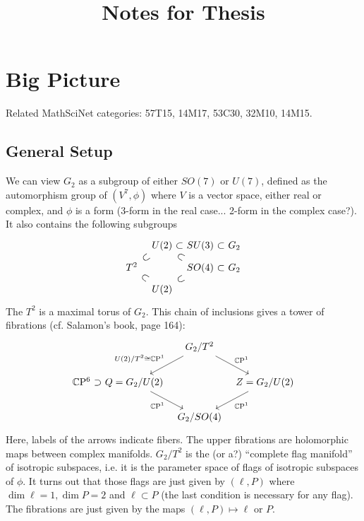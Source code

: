 \documentclass{scrartcl}
\title{Notes for Thesis}
\author{}
\date{}
\begin{document}
\maketitle
\tableofcontents

\section{Big Picture}

Related MathSciNet categories: 57T15, 14M17, 53C30, 32M10, 14M15.

\subsection{General Setup}

We can view $G_2$ as a subgroup of either $SO(7)$ or $U(7)$, defined as the automorphism group of $(V^7,\phi)$ where $V$ is a vector space, either real or complex, and $\phi$ is a form (3-form in the real case... 2-form in the complex case?).
It also contains the following subgroups
\begin{equation*}
	\begin{tikzcd}[sep=tiny]
		& U(2) \ar[draw=none]{r}[sloped,auto=false]{\scalebox{1.3}[1.3]{$\subset$}}
		\ar[draw=none]{dr}[sloped,auto=false]{\scalebox{1.3}[1.3]{$\subset$}} 
		& SU(3) \ar[draw=none]{r}[sloped,auto=false]{\scalebox{1.3}[1.3]{$\subset$}} 
		& G_2 \\
		T^2 \ar[draw=none]{ur}[sloped,auto=false]{\scalebox{1.3}[1.3]{$\subset$}}
		\ar[draw=none]{dr}[sloped,auto=false]{\scalebox{1.3}[1.3]{$\subset$}} & 
		& SO(4) \ar[draw=none]{r}[sloped,auto=false]{\scalebox{1.3}[1.3]{$\subset$}}
		& G_2\\
		& U(2) \ar[draw=none]{ur}[sloped,auto=false]{\scalebox{1.3}[1.3]{$\subset$}}
	\end{tikzcd}
\end{equation*}
The $T^2$ is a
maximal torus of $G_2$. This chain of inclusions gives a tower of fibrations (cf. Salamon's book, page 164):
\begin{equation*}
	\begin{tikzcd}[column sep=tiny]
		& & G_2/T^2 \ar[dr,"\CP^1"] \ar[dl,"U(2)/T^2\cong \CP^1"'] \\
		\CP^6 \ar[draw=none]{r}[sloped,auto=false]{\scalebox{1.3}[1.3]{$\supset$}}
		&[-23pt] Q=G_2/U(2) \ar[dr,"\CP^1"'] & & Z=G_2/U(2) \ar[dl,"\CP^1"]\\
		& & G_2/SO(4)
	\end{tikzcd}
\end{equation*}
Here, labels of the arrows indicate fibers. The upper fibrations are holomorphic maps between complex manifolds. 
$G_2/T^2$ is the (or a?) ``complete flag manifold'' of isotropic subspaces, i.e. it is the parameter space of flags of isotropic subspaces of $\phi$. It turns out
that those flags are just given by $(\ell,P)$ where $\dim \ell=1,\dim P=2$ and $\ell\subset P$ (the last condition is necessary for any flag). The fibrations are just given by the maps $(\ell,P)\mapsto \ell$ or $P$. 
\end{document}
